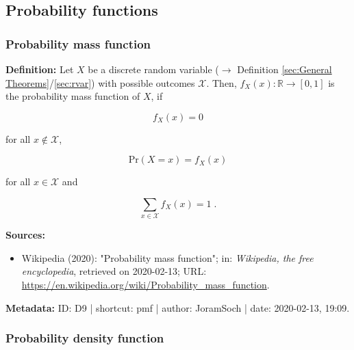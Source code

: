 \documentclass[a4paper,12pt,twoside]{book}
\begin{document}
\subsection{Probability functions}

\subsubsection[\textit{Probability mass function}]{Probability mass function} \label{sec:pmf}
\setcounter{equation}{0}

\textbf{Definition:} Let $X$ be a discrete random variable ($\rightarrow$ Definition \ref{sec:General Theorems}/\ref{sec:rvar}) with possible outcomes $\mathcal{X}$. Then, $f_X(x): \mathbb{R} \to [0,1]$ is the probability mass function of $X$, if

\begin{equation} \label{eq:pmf-pmf-def-s0}
f_X(x) = 0
\end{equation}

for all $x \notin \mathcal{X}$,

\begin{equation} \label{eq:pmf-pmf-def-s1}
\mathrm{Pr}(X = x) = f_X(x)
\end{equation}

for all $x \in \mathcal{X}$ and

\begin{equation} \label{eq:pmf-pmf-def-s2}
\sum_{x \in \mathcal{X}} f_X(x) = 1 \; .
\end{equation}


\vspace{1em}
\textbf{Sources:}
\begin{itemize}
\item Wikipedia (2020): "Probability mass function"; in: \textit{Wikipedia, the free encyclopedia}, retrieved on 2020-02-13; URL: \url{https://en.wikipedia.org/wiki/Probability_mass_function}.
\end{itemize}


\vspace{1em}
\textbf{Metadata:} ID: D9 | shortcut: pmf | author: JoramSoch | date: 2020-02-13, 19:09.
\vspace{1em}



\subsubsection[\textit{Probability density function}]{Probability density function} \label{sec:pdf}
\setcounter{equation}{0}
\end{document}

